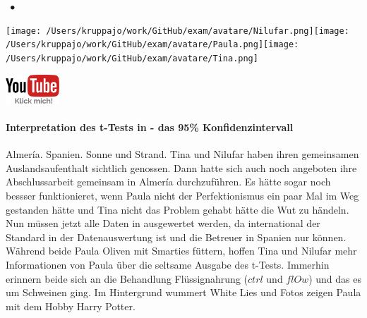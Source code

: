 \documentclass[a4paper, 9pt]{scrartcl}\usepackage[]{graphicx}\usepackage[]{xcolor}
\begin{document}
 
\ifcollection
\begin{flushright}
\tiny\vspace{-3Ex}
\textbf{\examinhaltstart}
\exammodulestatversuch $\;\bullet$
\exammodulebiostat
\vspace{-4Ex}
\end{flushright}
\begin{minipage}[t]{0.5\textwidth}
\texttt{[image: /Users/kruppajo/work/GitHub/exam/avatare/Nilufar.png]}\hspace{-4mm}\texttt{[image: /Users/kruppajo/work/GitHub/exam/avatare/Paula.png]}\hspace{-4mm}\texttt{[image: /Users/kruppajo/work/GitHub/exam/avatare/Tina.png]}
\end{minipage}
\begin{minipage}[t]{0.5\textwidth}
\hfill
\href{https://youtu.be/zppl5eq4ioU}{\includegraphics[width = 2cm]{img/youtube}}
\end{minipage}
\fi



\ifcollection
\paragraph{Interpretation des t-Tests in \Rlogo - das 95\% Konfidenzintervall}
\fi


Almería. Spanien. Sonne und Strand. Tina und Nilufar haben ihren gemeinsamen Auslandsaufenthalt sichtlich genossen. Dann hatte sich auch noch angeboten ihre Abschlussarbeit gemeinsam in Almería durchzuführen. Es hätte sogar noch bessser funktionieret, wenn Paula nicht der Perfektionismus ein paar Mal im Weg gestanden hätte und Tina nicht das Problem gehabt hätte die Wut zu händeln. Nun müssen jetzt alle Daten in \Rlogo ausgewertet werden, da \Rlogo international der Standard in der Datenauswertung ist und die Betreuer in Spanien nur \Rlogo können. Während beide Paula Oliven mit Smarties füttern, hoffen Tina und Nilufar mehr Informationen von Paula über die seltsame \Rlogo Ausgabe des t-Tests. Immerhin erinnern beide sich an die Behandlung Flüssignahrung ($ctrl$ und $flOw$) und das es um Schweinen ging. Im Hintergrund wummert White Lies und Fotos zeigen Paula mit dem Hobby Harry Potter.
\end{document}
